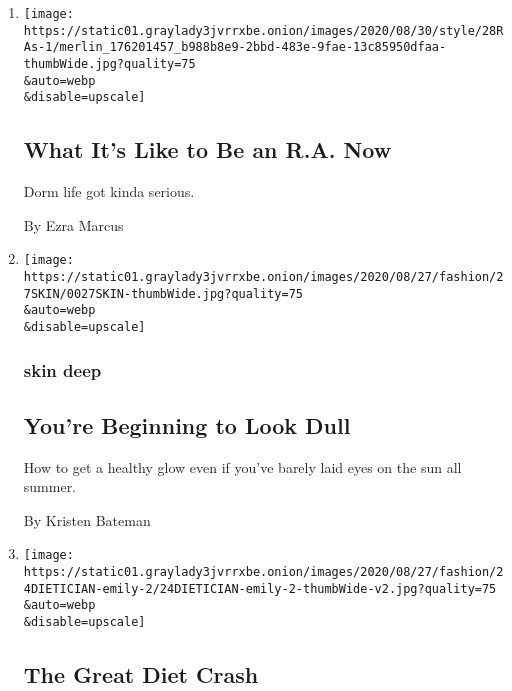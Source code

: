 \begin{enumerate}
\def\labelenumi{\arabic{enumi}.}
\item
  \href{/2020/08/29/style/what-its-like-to-be-an-ra-now.html}{}

  \texttt{[image: https://static01.graylady3jvrrxbe.onion/images/2020/08/30/style/28RAs-1/merlin\_176201457\_b988b8e9-2bbd-483e-9fae-13c85950dfaa-thumbWide.jpg?quality=75\\\&auto=webp\\\&disable=upscale]}

  \hypertarget{what-its-like-to-be-an-ra-now}{%
  \subsection{What It's Like to Be an R.A.
  Now}\label{what-its-like-to-be-an-ra-now}}

  Dorm life got kinda serious.

  By Ezra Marcus
\item
  \href{/2020/08/27/style/youre-beginning-to-look-dull.html}{}

  \texttt{[image: https://static01.graylady3jvrrxbe.onion/images/2020/08/27/fashion/27SKIN/0027SKIN-thumbWide.jpg?quality=75\\\&auto=webp\\\&disable=upscale]}

  \hypertarget{skin-deep-2}{%
  \subsubsection{skin deep}\label{skin-deep-2}}

  \hypertarget{youre-beginning-to-look-dull}{%
  \subsection{You're Beginning to Look
  Dull}\label{youre-beginning-to-look-dull}}

  How to get a healthy glow even if you've barely laid eyes on the sun
  all summer.

  By Kristen Bateman
\item
  \href{/2020/08/24/style/f-factor-diet-instagram.html}{}

  \texttt{[image: https://static01.graylady3jvrrxbe.onion/images/2020/08/27/fashion/24DIETICIAN-emily-2/24DIETICIAN-emily-2-thumbWide-v2.jpg?quality=75\\\&auto=webp\\\&disable=upscale]}

  \hypertarget{the-great-diet-crash}{%
  \subsection{The Great Diet Crash}\label{the-great-diet-crash}}


\end{enumerate}
